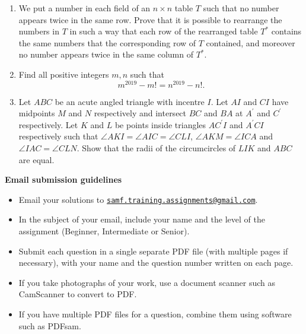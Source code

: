 \documentclass{article}
\begin{document}
\begin{enumerate}[1.]
\vspace{6pt}
\item %
We put a number in each field of an $n \times n$ table $T$ such that no number appears twice in the same row. Prove that it is possible to rearrange the numbers in $T$ in such a way that each row of the rearranged table $T^*$ contains the same numbers that the corresponding row of $T$ contained, and moreover no number appears twice in the same column of $T^*$.


\vspace{6pt}
\item %
Find all positive integers $m, n$ such that
\[ m^{2019} - m! = n^{2019} - n! . \]


\vspace{6pt}
\item %
Let $ABC$ be an acute angled triangle with incentre $I$. Let $AI$ and $CI$ have midpoints $M$ and $N$ respectively and intersect $BC$ and $BA$ at $A^\prime$ and $C^\prime$ respectively. Let $K$ and $L$ be points inside triangles $AC^\prime I$ and $A^\prime CI$ respectively such that $\angle AKI = \angle AIC = \angle CLI$, $\angle AKM = \angle ICA$ and $\angle IAC = \angle CLN$. Show that the radii of the circumcircles of $LIK$ and $ABC$ are equal.

\end{enumerate}


\vfill
\textbf{\Large Email submission guidelines}
\begin{itemize}
	\item Email your solutions to \href{mailto:samf.training.assignments@gmail.com}{\texttt{samf.training.assignments@gmail.com}}.
	\item In the subject of your email, include your name and the level of the assignment (Beginner, Intermediate or Senior).
	\item Submit each question in a single separate PDF file (with multiple pages if necessary), with your name and the question number written on each page.
	\item If you take photographs of your work, use a document scanner such as CamScanner to convert to PDF.
	\item If you have multiple PDF files for a question, combine them using software such as PDFsam.
\end{itemize}
\end{document}
